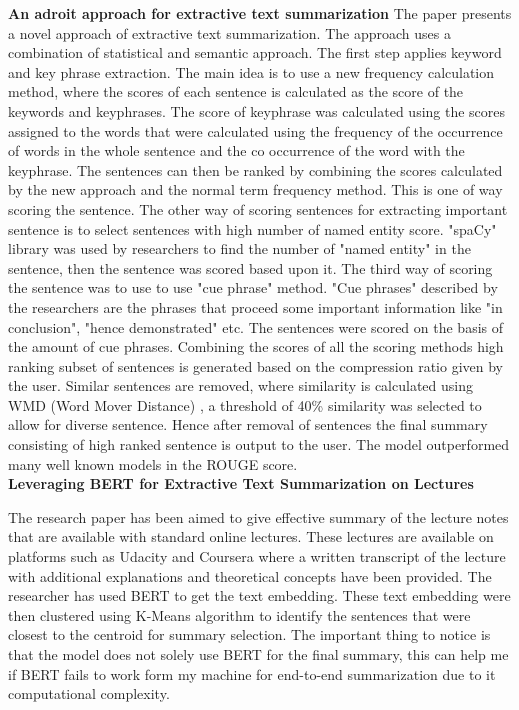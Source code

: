 \documentclass[11pt,a4paper]{article}
\begin{document}
\textbf{  An adroit approach for extractive text summarization}\citep{sariki2019adroit}
The paper presents a novel approach of extractive text summarization. The approach uses a combination of statistical and semantic approach. The first step applies keyword and key phrase extraction. The main idea is to use a new frequency calculation method, where the scores of each sentence is calculated as the score of the keywords and keyphrases. The score of keyphrase was calculated using the scores assigned to the words that were calculated using the frequency of the occurrence of words in the whole sentence and the co occurrence of the word with the keyphrase. The sentences can then be ranked by combining the scores calculated by the new approach and the normal term frequency method. This is one of way scoring the sentence. The other way of scoring sentences for extracting important sentence is to select sentences with high number of named entity score. "spaCy" library was used by researchers to find the number of "named entity" in the sentence, then the sentence was scored based upon it. The third way of scoring the sentence was to use to use "cue phrase" method. "Cue phrases" described by the researchers are the phrases that proceed some important information like "in conclusion", "hence demonstrated" etc. The sentences were scored on the basis of the amount of cue phrases. Combining the scores of all the scoring methods high ranking subset of sentences is generated based on the compression ratio given by the user. Similar sentences are removed, where similarity is calculated using WMD (Word Mover Distance)  \citep{kusner2015word}, a threshold of 40\% similarity was selected to allow for diverse sentence. Hence after removal of sentences the final summary consisting of high ranked sentence is output to the user. The model outperformed many well known models in the ROUGE  \citep{lin-2004-rouge} score.
\\
\textbf{Leveraging BERT for Extractive Text Summarization on Lectures} \citep{miller2019leveraging}

The research paper has been aimed to give effective summary of the lecture notes that are available with standard online lectures. These lectures are available on platforms such as Udacity and Coursera where a written transcript of the lecture with additional explanations and theoretical concepts have been provided. The researcher has used BERT \citep{devlin-etal-2019-bert} to get the text embedding. These text embedding were then clustered using K-Means algorithm to identify the sentences that were closest to the centroid for summary selection.  The important thing to notice is that the model does not solely use BERT for the final summary, this can help me if BERT fails to work form my machine for end-to-end summarization due to it computational complexity.
\end{document}
